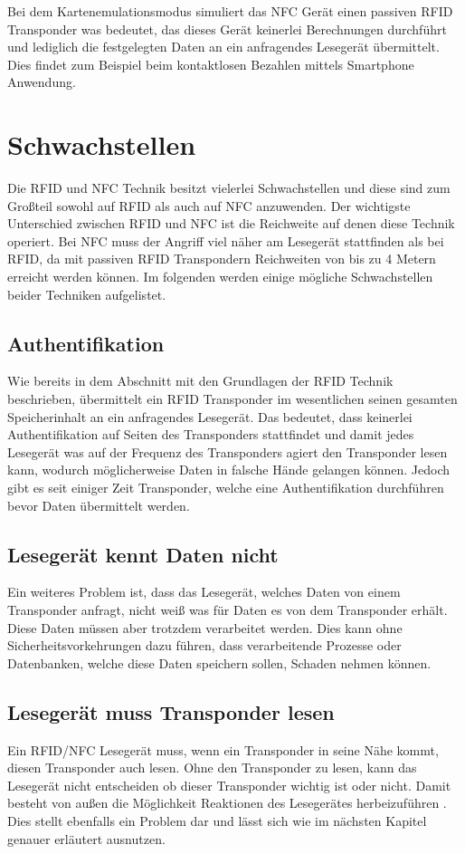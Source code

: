 \documentclass[conference]{IEEEtran}
\begin{document}
Bei dem Kartenemulationsmodus simuliert das NFC Gerät einen passiven RFID Transponder was bedeutet, das dieses Gerät keinerlei Berechnungen durchführt und lediglich die festgelegten Daten an ein anfragendes Lesegerät übermittelt. Dies findet zum Beispiel beim kontaktlosen Bezahlen mittels Smartphone Anwendung.


\section{Schwachstellen}
Die RFID und NFC Technik besitzt vielerlei Schwachstellen und diese sind zum Großteil sowohl auf RFID als auch auf NFC anzuwenden. Der wichtigste Unterschied zwischen RFID und NFC ist die Reichweite auf denen diese Technik operiert. Bei NFC muss der Angriff viel näher am Lesegerät stattfinden als bei RFID, da mit passiven RFID Transpondern Reichweiten von bis zu 4 Metern erreicht werden können. Im folgenden werden einige mögliche Schwachstellen beider Techniken aufgelistet.

\subsection{Authentifikation}
Wie bereits in dem Abschnitt mit den Grundlagen der RFID Technik beschrieben, übermittelt ein RFID Transponder im wesentlichen seinen gesamten Speicherinhalt an ein anfragendes Lesegerät. Das bedeutet, dass keinerlei Authentifikation auf Seiten des Transponders stattfindet und damit jedes Lesegerät was auf der Frequenz des Transponders agiert den Transponder lesen kann, wodurch möglicherweise Daten in falsche Hände gelangen können. Jedoch gibt es seit einiger Zeit Transponder, welche eine Authentifikation durchführen bevor Daten übermittelt werden.

\subsection{Lesegerät kennt Daten nicht}
Ein weiteres Problem ist, dass das Lesegerät, welches Daten von einem Transponder anfragt, nicht weiß was für Daten es von dem Transponder erhält. Diese Daten müssen aber trotzdem verarbeitet werden. Dies kann ohne Sicherheitsvorkehrungen dazu führen, dass verarbeitende Prozesse oder Datenbanken, welche diese Daten speichern sollen, Schaden nehmen können.

\subsection{Lesegerät muss Transponder lesen}
Ein RFID/NFC Lesegerät muss, wenn ein Transponder in seine Nähe kommt, diesen Transponder auch lesen. Ohne den Transponder zu lesen, kann das Lesegerät nicht entscheiden ob dieser Transponder wichtig ist oder nicht. Damit besteht von außen die Möglichkeit Reaktionen des Lesegerätes herbeizuführen \cite{b3}. Dies stellt ebenfalls ein Problem dar und lässt sich wie im nächsten Kapitel genauer erläutert ausnutzen.
\end{document}
